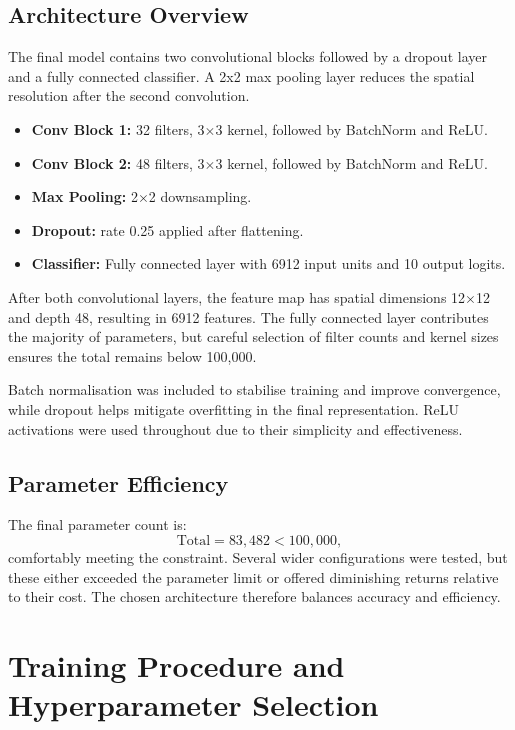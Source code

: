 \documentclass[11pt]{article}
\begin{document}
\subsection{Architecture Overview}

The final model contains two convolutional blocks followed by a dropout layer and a fully connected classifier. A 2x2 max pooling layer reduces the spatial resolution after the second convolution.

\begin{itemize}
    \item \textbf{Conv Block 1:} 32 filters, 3$\times$3 kernel, followed by BatchNorm and ReLU.
    \item \textbf{Conv Block 2:} 48 filters, 3$\times$3 kernel, followed by BatchNorm and ReLU.
    \item \textbf{Max Pooling:} 2$\times$2 downsampling.
    \item \textbf{Dropout:} rate 0.25 applied after flattening.
    \item \textbf{Classifier:} Fully connected layer with 6912 input units and 10 output logits.
\end{itemize}

After both convolutional layers, the feature map has spatial dimensions 12$\times$12 and depth 48, resulting in 6912 features. The fully connected layer contributes the majority of parameters, but careful selection of filter counts and kernel sizes ensures the total remains below 100,000.

Batch normalisation was included to stabilise training and improve convergence, while dropout helps mitigate overfitting in the final representation. ReLU activations were used throughout due to their simplicity and effectiveness.

\subsection{Parameter Efficiency}

The final parameter count is:
\[
\text{Total} = 83,\!482 < 100,\!000,
\]
comfortably meeting the constraint. Several wider configurations were tested, but these either exceeded the parameter limit or offered diminishing returns relative to their cost. The chosen architecture therefore balances accuracy and efficiency.

\section{Training Procedure and Hyperparameter Selection}
\end{document}
